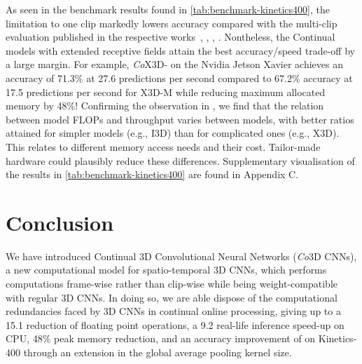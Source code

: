 \documentclass[runningheads]{llncs}
\begin{document}
As seen in the benchmark results found in \cref{tab:benchmark-kinetics400},
the limitation to one clip markedly lowers accuracy compared with the multi-clip evaluation published in the respective works~\cite{carreira2017quo}, \cite{tran2018closer}, \cite{feichtenhofer2019slowfast}, \cite{feichtenhofer2020x3d}.
Nontheless, the Continual models with extended receptive fields attain the best accuracy/speed trade-off by a large margin. 
For example, \textit{Co}X3D- on the Nvidia Jetson Xavier achieves an accuracy of 71.3\% at 27.6 predictions per second compared to 67.2\% accuracy at 17.5 predictions per second for X3D-M while reducing maximum allocated memory by 48\%! 
Confirming the observation in \cite{ma2018shufflenetv2}, we find that the relation between model FLOPs and throughput varies between models, with better ratios attained for simpler models (e.g., I3D) than for complicated ones (e.g., X3D). 
This relates to different memory access needs and their cost. Tailor-made hardware could plausibly reduce these differences.
Supplementary visualisation of the results in \cref{tab:benchmark-kinetics400} are found in Appendix C.












































 \section{Conclusion} \label{sec:conclusion}
We have introduced Continual 3D Convolutional Neural Networks (\textit{Co}3D CNNs), a new computational model for spatio-temporal 3D CNNs, which performs computations frame-wise rather than clip-wise while being weight-compatible with regular 3D CNNs. 
In doing so, we are able dispose of the computational redundancies faced by 3D CNNs in continual online processing, giving up to a 15.1 reduction of floating point operations,
a 9.2 real-life inference speed-up on CPU, 48\% peak memory reduction,
and an accuracy improvement of  on Kinetics-400 through an extension in the global average pooling kernel size.
\end{document}
